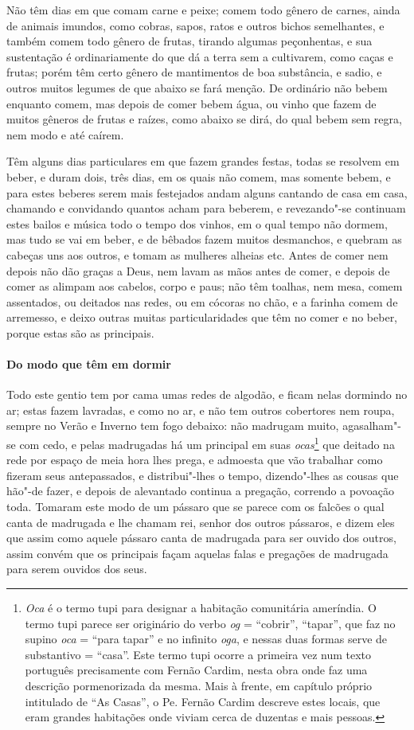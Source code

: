 \begin{linenumbers}
 Não têm dias em que comam carne e peixe; comem todo gênero de carnes,
ainda de animais imundos, como cobras, sapos, ratos e outros bichos
semelhantes, e também comem todo gênero de frutas, tirando algumas
peçonhentas, e sua sustentação é ordinariamente do que dá a terra sem
a cultivarem, como caças e frutas; porém têm certo gênero de
mantimentos de boa substância, e sadio, e outros muitos legumes de que
abaixo se fará menção. De ordinário não bebem enquanto comem, mas
depois de comer bebem água, ou vinho que fazem de muitos gêneros de
frutas e raízes, como abaixo se dirá, do qual bebem sem regra, nem modo
e até caírem.

 Têm alguns dias particulares em que fazem grandes festas, todas se
resolvem em beber, e duram dois, três dias, em os quais não comem, mas
somente bebem, e para estes beberes serem mais festejados andam alguns
cantando de casa em casa, chamando e convidando quantos acham para
beberem, e revezando"-se continuam estes bailos e música todo o tempo
dos vinhos, em o qual tempo não dormem, mas tudo se vai em beber, e de
bêbados fazem muitos desmanchos, e quebram as cabeças uns aos outros, e
tomam as mulheres alheias etc. Antes de comer nem depois não dão
graças a Deus, nem lavam as mãos antes de comer, e depois de comer as
alimpam aos cabelos, corpo e paus; não têm toalhas, nem mesa, comem
assentados, ou deitados nas redes, ou em cócoras no chão, e a farinha
comem de arremesso, e deixo outras muitas particularidades que têm no
comer e no beber, porque estas são as principais.

\paragraph{Do modo que têm em dormir} \quad
Todo este gentio tem por cama umas redes de algodão, e ficam
nelas dormindo no ar; estas fazem lavradas, e como no ar, e não tem
outros cobertores nem roupa, sempre no Verão e Inverno tem fogo
debaixo: não madrugam muito, agasalham"-se com cedo, e pelas madrugadas
há um principal em suas \textit{ocas}\footnote{ \textit{Oca} é o
termo tupi para designar a habitação comunitária ameríndia. O termo
tupi parece ser originário do verbo \textit{og} = ``cobrir'', ``tapar'',
que faz no supino \textit{oca} = ``para tapar'' e no infinito
\textit{oga}, e nessas duas formas serve de substantivo = ``casa''. 
Este termo tupi ocorre a primeira vez num texto português
precisamente com Fernão Cardim, nesta obra onde faz uma descrição
pormenorizada da mesma. Mais à frente, em capítulo próprio intitulado
de ``As Casas'', o Pe. Fernão Cardim descreve estes locais, que
eram grandes habitações onde viviam cerca de duzentas e mais pessoas.} 
que deitado na rede por espaço de meia hora lhes prega, e admoesta que
vão trabalhar como fizeram seus antepassados, e distribui"-lhes o tempo,
dizendo"-lhes as cousas que hão"-de fazer, e depois de alevantado
continua a pregação, correndo a povoação toda. Tomaram este modo de um
pássaro que se parece com os falcões o qual canta de madrugada e lhe
chamam rei, senhor dos outros pássaros, e dizem eles que assim como
aquele pássaro canta de madrugada para ser ouvido dos outros, assim
convém que os principais façam aquelas falas e pregações de madrugada
para serem ouvidos dos seus.


\end{linenumbers}
